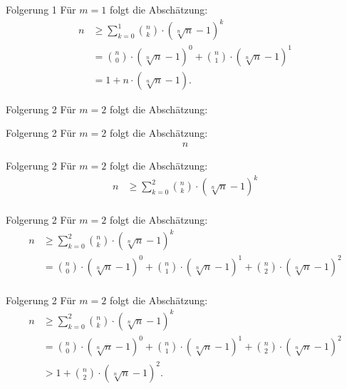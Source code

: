 \documentclass[10pt]{beamer}
\begin{document}
\begin{frame}{Folgerung 1}
    Für \( m = 1 \) folgt die Abschätzung:
    \begin{align*}
        n 
        & \geq \sum_{k = 0}^{1} \binom{n}{k} \cdot \left( \sqrt[n]{n} - 1 \right)^{k} \\
        & = \binom{n}{0} \cdot \left( \sqrt[n]{n} - 1 \right)^{0} + \binom{n}{1} \cdot \left( \sqrt[n]{n} - 1 \right)^{1} \\
        & = 1 + n \cdot \left( \sqrt[n]{n} - 1 \right).
    \end{align*}
\end{frame}



\begin{frame}{Folgerung 2}
    Für \( m = 2 \) folgt die Abschätzung:
\end{frame}



\begin{frame}{Folgerung 2}
    Für \( m = 2 \) folgt die Abschätzung:
    \begin{align*}
        n 
    \end{align*}
\end{frame}



\begin{frame}{Folgerung 2}
    Für \( m = 2 \) folgt die Abschätzung:
    \begin{align*}
        n 
        & \geq \sum_{k = 0}^{2} \binom{n}{k} \cdot \left( \sqrt[n]{n} - 1 \right)^{k} \\
    \end{align*}
\end{frame}



\begin{frame}{Folgerung 2}
    Für \( m = 2 \) folgt die Abschätzung:
    \begin{align*}
        n 
        & \geq \sum_{k = 0}^{2} \binom{n}{k} \cdot \left( \sqrt[n]{n} - 1 \right)^{k} \\
        & = \binom{n}{0} \cdot \left( \sqrt[n]{n} - 1 \right)^{0} + \binom{n}{1} \cdot \left( \sqrt[n]{n} - 1 \right)^{1} + \binom{n}{2} \cdot \left( \sqrt[n]{n} - 1 \right)^{2} \\
    \end{align*}
\end{frame}



\begin{frame}{Folgerung 2}
    Für \( m = 2 \) folgt die Abschätzung:
    \begin{align*}
        n 
        & \geq \sum_{k = 0}^{2} \binom{n}{k} \cdot \left( \sqrt[n]{n} - 1 \right)^{k} \\
        & = \binom{n}{0} \cdot \left( \sqrt[n]{n} - 1 \right)^{0} + \binom{n}{1} \cdot \left( \sqrt[n]{n} - 1 \right)^{1} + \binom{n}{2} \cdot \left( \sqrt[n]{n} - 1 \right)^{2} \\
        & > 1 + \binom{n}{2} \cdot \left( \sqrt[n]{n} - 1 \right)^{2}.
    \end{align*}
\end{frame}
\end{document}
